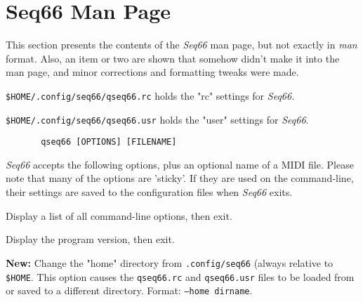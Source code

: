 %
%
%

\section{Seq66 Man Page}
\label{sec:man_page}

   This section presents the contents of the \textsl{Seq66} man page, but
   not exactly in \textsl{man} format.  Also, an item or two are shown that
   somehow didn't make it into the man page, and minor corrections and
   formatting tweaks were made.

   \texttt{\$HOME/.config/seq66/qseq66.rc} holds the "rc" settings
   for \textsl{Seq66}.

   \texttt{\$HOME/.config/seq66/qseq66.usr} holds the "user" settings
   for \textsl{Seq66}.

   \begin{verbatim}
       qseq66 [OPTIONS] [FILENAME]
   \end{verbatim}

   \textsl{Seq66} accepts the following options, plus an optional name of
   a MIDI file.  Please note that many of the options are 'sticky'.  If they
   are used on the command-line, their settings are saved to the configuration
   files when \textsl{Seq66} exits.

   \setcounter{ItemCounter}{0}      %

      Display a list of all command-line options, then exit.

      Display the program version, then exit.

      \textbf{New:}
      Change the "home" directory from \texttt{.config/seq66}
      (always relative to \texttt{\$HOME}.
      This option causes the \texttt{qseq66.rc}
      and \texttt{qseq66.usr} files to be loaded from or
      saved to a different directory.
      Format: \texttt{--home dirname}.

